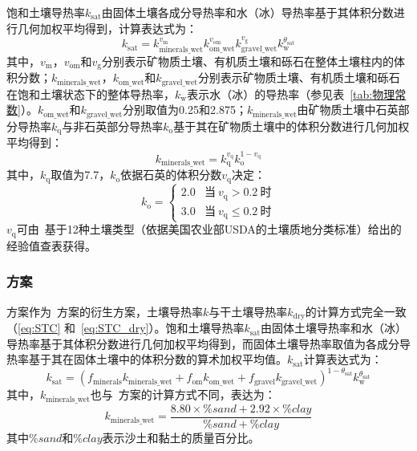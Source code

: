 饱和土壤导热率$k_{\mathrm{sat}}$由固体土壤各成分导热率和水（冰）导热率基于其体积分数进行几何加权平均得到，计算表达式为：
\begin{equation}\label{eq:STC_wet}
  k_{\mathrm{sat}}=k_{\mathrm{minerals\_wet}}^{v_{\mathrm {m}} }k_{\mathrm{om\_wet}}^{v_{\mathrm{om}}}k_{\mathrm{gravel\_wet}}^{v_{\mathrm {g}} }k_{\mathrm {w}} ^{\theta_{\mathrm {sat}} }
\end{equation}
其中，$v_{\mathrm {m}} $，$v_{\mathrm{om}}$和$v_{\mathrm {g}} $分别表示矿物质土壤、有机质土壤和砾石在整体土壤柱内的体积分数；$k_{\mathrm{minerals\_wet}}$，$k_{\mathrm{om\_wet}}$和$k_{\mathrm{gravel\_wet}}$分别表示矿物质土壤、有机质土壤和砾石在饱和土壤状态下的整体导热率，$k_{\mathrm {w}} $表示水（冰）的导热率（参见表~\ref{tab:物理常数}）。$k_{\mathrm{om\_wet}}$和$k_{\mathrm{gravel\_wet}}$分别取值为0.25和2.875；$k_{\mathrm{minerals\_wet}}$由矿物质土壤中石英部分导热率$k_{\mathrm {q}} $与非石英部分导热率$k_{\mathrm {o}} $基于其在矿物质土壤中的体积分数进行几何加权平均得到：$$k_{\mathrm{minerals\_wet}}=k_{\mathrm {q}} ^{v_{\mathrm {q}} }k_{\mathrm {o}} ^{1-v_{\mathrm {q}} }$$
其中，$k_{\mathrm {q}} $取值为7.7，$k_{\mathrm {o}} $依据石英的体积分数$v_{\mathrm {q}} $决定：
\begin{equation}
  k_{\mathrm {o}} =\begin{cases}
    2.0 & \text {当}\ v_{\mathrm {q}} >0.2\ \text {时} \\
    3.0 & \text {当}\ v_{\mathrm {q}} \leqslant 0.2\ \text {时}
  \end{cases}
\end{equation}
$v_{\mathrm {q}} $可由~\citet{PL_98}基于12种土壤类型（依据美国农业部USDA的土壤质地分类标准）给出的经验值查表获得。

\subsubsection{\citet{farouki1981thermal}方案}
\citet{farouki1981thermal}方案作为~\citet{Johansen1975}方案的衍生方案，土壤导热率$k$与干土壤导热率$k_{\mathrm{dry}}$的计算方式完全一致（\eqref{eq:STC} 和~\eqref{eq:STC_dry}）。饱和土壤导热率$k_{\mathrm{sat}}$由固体土壤导热率和水（冰）导热率基于其体积分数进行几何加权平均得到，而固体土壤导热率取值为各成分导热率基于其在固体土壤中的体积分数的算术加权平均值。$k_{\mathrm{sat}}$计算表达式为：
\begin{equation}\label{eq:STC_wet_Farouki}
  k_{\mathrm{sat}}=(f_{\mathrm{minerals}}k_{\mathrm{minerals\_wet}}+f_{\mathrm{om}}k_{\mathrm{om\_wet}}+f_{\mathrm{gravel}}k_{\mathrm{gravel\_wet}})^{1-\theta_{\mathrm {sat}} }k_{\mathrm {w}} ^{\theta_{\mathrm {sat}} }
\end{equation}
其中，$k_{\mathrm{minerals\_wet}}$也与~\citet{Johansen1975}方案的计算方式不同，表达为：$$k_{\mathrm{minerals\_wet}}=\frac{8.80\times\%sand+2.92\times\%clay}{\%sand+\%clay}$$
其中$\%sand$和$\%clay$表示沙土和黏土的质量百分比。

